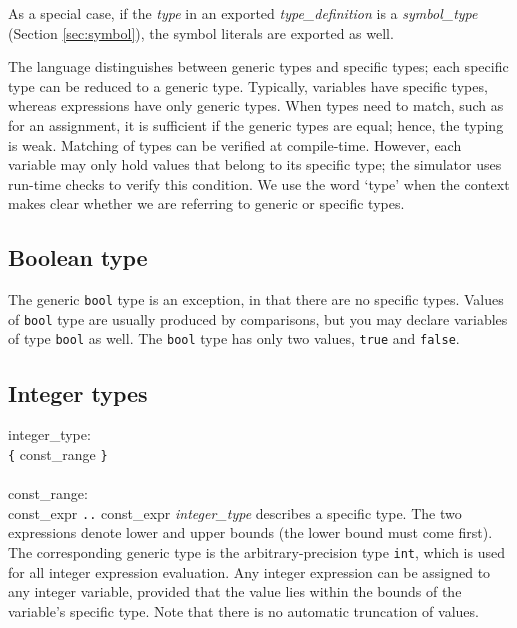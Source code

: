 As a special case, if the {\it{}type} in an exported {\it{}type\_definition}
is a {\it{}symbol\_type} (Section \ref{sec:symbol}), the symbol literals are
exported as well.

The language distinguishes between generic types and specific types;
each specific type can be reduced to a generic type.
Typically, variables have specific types, whereas expressions have only
generic types. When types need to match, such as for an assignment, it
is sufficient if the generic types are equal; hence, the typing is weak.
Matching of types can be verified at compile-time.
However, each variable may only
hold values that belong to its specific type; the simulator uses run-time
checks to verify this condition. We use the word `type' when the context
makes clear whether we are referring to generic or specific types.


\subsection{Boolean type}\label{sec:bool}

The generic {\tt{}bool} type is an exception, in that there are no specific
types. Values of {\tt{}bool} type are usually produced by comparisons, but
you may declare variables of type {\tt{}bool} as well.
The {\tt{}bool} type has only two values, {\tt{}true} and {\tt{}false}.


\subsection{Integer types}\label{sec:int}

\grammarstart
integer\_type: \\
      \>\verb|{| const\_range \verb|}| \\
 \\
const\_range: \\
      \>const\_expr {\tt{}..} const\_expr
\grammarend
{\it{}integer\_type} describes a specific type.
The two expressions denote lower and upper bounds (the lower bound must
come first). The corresponding generic type is the arbitrary-precision
type {\tt{}int}, which is used for all integer expression evaluation.
Any integer expression can be assigned to any integer variable, provided
that the value lies within the bounds of the variable's specific type.
Note that there is no automatic truncation of values.

